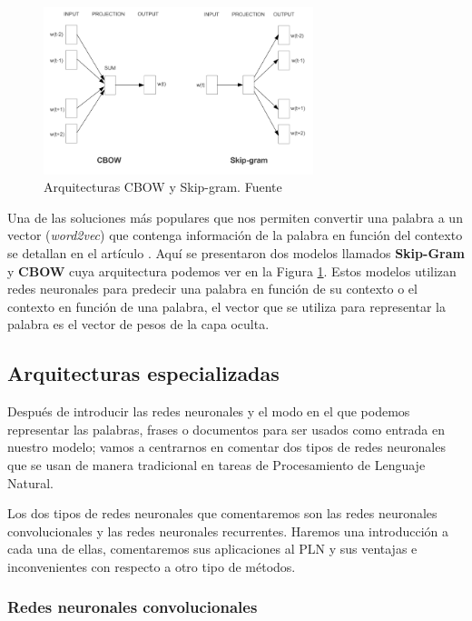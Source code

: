 \begin{figure}[!ht]
	\centering
	\includegraphics[width=0.7\textwidth]{images/arte/word2vec}
	\caption{Arquitecturas CBOW y Skip-gram. Fuente \cite{word2vec}}
	\label{fig:wor2vec}
\end{figure}

Una de las soluciones más populares que nos permiten convertir una palabra a un vector (\textit{word2vec}) que contenga información de la palabra en función del contexto se detallan en el artículo \cite{word2vec} . Aquí se presentaron dos modelos llamados \textbf{Skip-Gram} y \textbf{CBOW} cuya arquitectura podemos ver en la Figura \ref{fig:wor2vec}. Estos modelos utilizan redes neuronales para predecir una palabra en función de su contexto o el contexto en función de una palabra, el vector que se utiliza para representar la palabra es el vector de pesos de la capa oculta. 



\subsection{Arquitecturas especializadas}

Después de introducir las redes neuronales y el modo en el que podemos representar las palabras, frases o documentos para ser usados como entrada en nuestro modelo; vamos a centrarnos en comentar dos tipos de redes neuronales que se usan de manera tradicional en tareas de Procesamiento de Lenguaje Natural. 

Los dos tipos de redes neuronales que comentaremos son las redes neuronales convolucionales y las redes neuronales recurrentes. Haremos una introducción a cada una de ellas, comentaremos sus aplicaciones al PLN y sus ventajas e inconvenientes con respecto a otro tipo de métodos. 


\subsubsection{Redes neuronales convolucionales}

